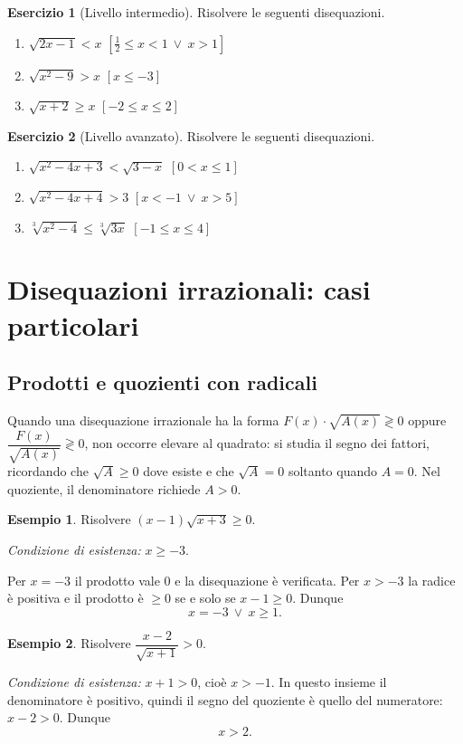 \documentclass[12pt,a4paper,openany]{book}
\theoremstyle{definition}
\newtheorem{esempio}{Esempio}[section]
\newtheorem{esercizio}{Esercizio}[section]
\theoremstyle{plain}
\theoremstyle{remark}
\begin{document}
\begin{esercizio}[Livello intermedio]
Risolvere le seguenti disequazioni.
\begin{enumerate}[label=\alph*)]
\item $\sqrt{2x-1}<x$ \hfill $[\tfrac12\le x<1\ \lor\ x>1]$
\item $\sqrt{x^2-9}>x$ \hfill $[x\le -3]$
\item $\sqrt{x+2}\ge x$ \hfill $[-2\le x\le 2]$
\end{enumerate}
\end{esercizio}

\begin{esercizio}[Livello avanzato]
Risolvere le seguenti disequazioni.
\begin{enumerate}[label=\alph*)]
\item $\sqrt{x^2-4x+3}<\sqrt{3-x}$ \hfill $[0<x\le 1]$
\item $\sqrt{x^2-4x+4}>3$ \hfill $[x<-1\ \lor\ x>5]$
\item $\sqrt[3]{x^2-4}\le\sqrt[3]{3x}$ \hfill $[-1\le x\le 4]$
\end{enumerate}
\end{esercizio}

\section{Disequazioni irrazionali: casi particolari}

\subsection*{Prodotti e quozienti con radicali}

Quando una disequazione irrazionale ha la forma $F(x)\cdot\sqrt{A(x)}\gtrless 0$ oppure $\dfrac{F(x)}{\sqrt{A(x)}}\gtrless 0$, non occorre elevare al quadrato: si studia il segno dei fattori, ricordando che $\sqrt{A}\ge 0$ dove esiste e che $\sqrt{A}=0$ soltanto quando $A=0$. Nel quoziente, il denominatore richiede $A>0$.

\begin{esempio}
Risolvere $(x-1)\sqrt{x+3}\ge 0$.

\emph{Condizione di esistenza:} $x\ge -3$.

Per $x=-3$ il prodotto vale $0$ e la disequazione è verificata. Per $x>-3$ la radice è positiva e il prodotto è $\ge 0$ se e solo se $x-1\ge 0$. Dunque
\[
x=-3\ \lor\ x\ge 1.
\]
\end{esempio}

\begin{esempio}
Risolvere $\dfrac{x-2}{\sqrt{x+1}}>0$.

\emph{Condizione di esistenza:} $x+1>0$, cioè $x>-1$. In questo insieme il denominatore è positivo, quindi il segno del quoziente è quello del numeratore: $x-2>0$. Dunque
\[
x>2.
\]
\end{esempio}
\end{document}
